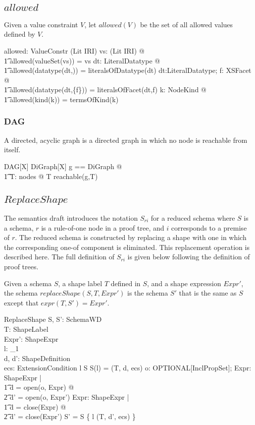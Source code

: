 \documentclass{article}
\begin{document}
\subsection{$allowed$}
Given a value constraint $V$, let $allowed(V)$ be the set of all allowed values defined by $V$.
\begin{axdef}
	allowed: ValueConstr \fun \power (Lit \cup IRI)
\where
	\forall vs: \power (Lit \cup IRI) @ \\
\t1		allowed(valueSet(vs)) = vs
\also
	\forall dt: LiteralDatatype @ \\
\t1		allowed(datatype(dt,\emptyset)) = literalsOfDatatype(dt)
\also
	\forall dt:LiteralDatatype; f: XSFacet @ \\
\t1		allowed(datatype(dt,\{f\})) = literalsOfFacet(dt,f)
\also
	\forall k: NodeKind @ \\
\t1		allowed(kind(k)) = termsOfKind(k)
\end{axdef}

\subsubsection{DAG}
A directed, acyclic graph is a directed graph in which no node is reachable from itself.
\begin{schema}{DAG}[X]
	 DiGraph[X]
\where
	\LET g == \theta DiGraph @ \\
\t1		\forall T: nodes @ T \notin reachable(g,T)
\end{schema}

\subsection{$ReplaceShape$}
The semantics draft introduces the notation $S_{ri}$ for a reduced schema where $S$ is a schema, 
$r$ is a rule-of-one node in a proof tree, and $i$ corresponds to a premise of $r$.
The reduced schema is constructed by replacing a shape with one in which the corresponding one-of component is eliminated.
This replacement operation is described here.
The full definition of $S_{ri}$ is given below following the definition of proof trees.

Given a schema $S$, a shape label $T$ defined in $S$, and a shape expression $Expr'$, the schema $replaceShape(S,T,Expr')$
is the schema $S'$ that is the same as $S$ except that $expr(T,S') = Expr'$.
\begin{schema}{ReplaceShape}
	S, S': SchemaWD \\
	T: ShapeLabel \\
	Expr': ShapeExpr \\
	l: \nat_1\\
	d, d': ShapeDefinition \\
	ecs: \seq ExtensionCondition
\where
	l \in \dom S
\also
	S(l) = (T, d, ecs)
\also
	\forall o: OPTIONAL[InclPropSet]; Expr: ShapeExpr | \\
\t1		d = open(o, Expr) @ \\
\t2			d' = open(o, Expr')
\also
	\forall Expr: ShapeExpr | \\
\t1		d = close(Expr) @ \\
\t2			d' = close(Expr')
\also
	S' = S \oplus \{ l \mapsto (T, d', ecs) \}
\end{schema}
\end{document}
